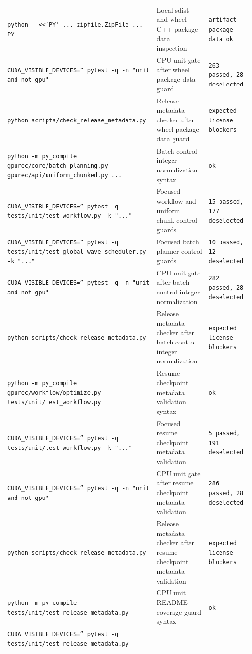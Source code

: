 \documentclass[11pt]{article}
\begin{document}
\begin{center}
\begin{tabular}{lll}
\texttt{python - <<'PY' ... zipfile.ZipFile ... PY} &
Local sdist and wheel C++ package-data inspection &
\texttt{artifact package data ok} \\
\texttt{CUDA\_VISIBLE\_DEVICES='' pytest -q -m "unit and not gpu"} &
CPU unit gate after wheel package-data guard &
\texttt{263 passed, 28 deselected} \\
\texttt{python scripts/check\_release\_metadata.py} &
Release metadata checker after wheel package-data guard &
\texttt{expected license blockers} \\
\texttt{python -m py\_compile gpurec/core/batch\_planning.py gpurec/api/uniform\_chunked.py ...} &
Batch-control integer normalization syntax &
\texttt{ok} \\
\texttt{CUDA\_VISIBLE\_DEVICES='' pytest -q tests/unit/test\_workflow.py -k "..."} &
Focused workflow and uniform chunk-control guards &
\texttt{15 passed, 177 deselected} \\
\texttt{CUDA\_VISIBLE\_DEVICES='' pytest -q tests/unit/test\_global\_wave\_scheduler.py -k "..."} &
Focused batch planner control guards &
\texttt{10 passed, 12 deselected} \\
\texttt{CUDA\_VISIBLE\_DEVICES='' pytest -q -m "unit and not gpu"} &
CPU unit gate after batch-control integer normalization &
\texttt{282 passed, 28 deselected} \\
\texttt{python scripts/check\_release\_metadata.py} &
Release metadata checker after batch-control integer normalization &
\texttt{expected license blockers} \\
\texttt{python -m py\_compile gpurec/workflow/optimize.py tests/unit/test\_workflow.py} &
Resume checkpoint metadata validation syntax &
\texttt{ok} \\
\texttt{CUDA\_VISIBLE\_DEVICES='' pytest -q tests/unit/test\_workflow.py -k "..."} &
Focused resume checkpoint metadata validation &
\texttt{5 passed, 191 deselected} \\
\texttt{CUDA\_VISIBLE\_DEVICES='' pytest -q -m "unit and not gpu"} &
CPU unit gate after resume checkpoint metadata validation &
\texttt{286 passed, 28 deselected} \\
\texttt{python scripts/check\_release\_metadata.py} &
Release metadata checker after resume checkpoint metadata validation &
\texttt{expected license blockers} \\
\texttt{python -m py\_compile tests/unit/test\_release\_metadata.py} &
CPU unit README coverage guard syntax &
\texttt{ok} \\
\texttt{CUDA\_VISIBLE\_DEVICES='' pytest -q tests/unit/test\_release\_metadata.py} &

\end{tabular}
\end{center}
\end{document}
